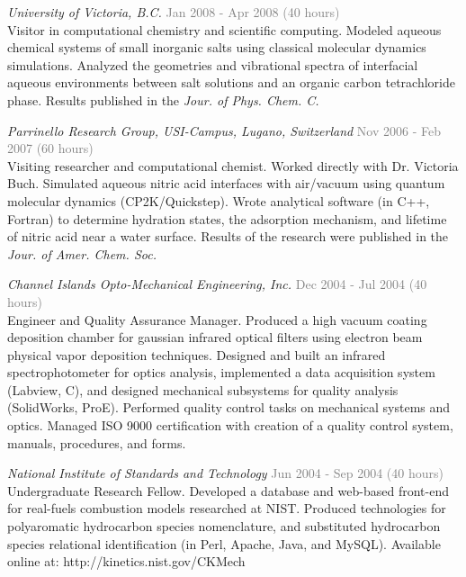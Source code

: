 \documentclass[margin,line]{res}
\begin{document}
\begin{resume}
\emph{University of Victoria, B.C.} \hfill {\textcolor{gray}{Jan 2008 - Apr 2008 (40 hours)}}\\
\nopagebreak
Visitor in computational chemistry and scientific computing.  Modeled aqueous chemical systems of small inorganic salts using classical molecular dynamics simulations. Analyzed the geometries and vibrational spectra of interfacial aqueous environments between salt solutions and an organic carbon tetrachloride phase. Results published in the \textit{Jour. of Phys. Chem. C.}

\emph{Parrinello Research Group, USI-Campus, Lugano, Switzerland}  \hfill { \textcolor{gray}{Nov 2006 - Feb 2007 (60 hours)}} \\
\nopagebreak
Visiting researcher and computational chemist. Worked directly with Dr. Victoria Buch. Simulated aqueous nitric acid interfaces with air/vacuum using quantum molecular dynamics (CP2K/Quickstep). Wrote analytical software (in C++, Fortran) to determine hydration states, the adsorption mechanism, and lifetime of nitric acid near a water surface. Results of the research were published in the \textit{Jour. of Amer. Chem. Soc.}


\pagebreak
\emph{Channel Islands Opto-Mechanical Engineering, Inc.} \hfill {\textcolor{gray}{Dec 2004 - Jul 2004 (40 hours)}} \\
Engineer and Quality Assurance Manager. Produced a high vacuum coating deposition chamber for gaussian infrared optical filters using electron beam physical vapor deposition techniques. Designed and built an infrared spectrophotometer for optics analysis, implemented a data acquisition system (Labview, C), and designed mechanical subsystems for quality analysis (SolidWorks, ProE). Performed quality control tasks on mechanical systems and optics. Managed ISO 9000 certification with creation of a quality control system, manuals, procedures, and forms. 

\emph{National Institute of Standards and Technology} \hfill {\textcolor{gray}{Jun 2004 - Sep 2004 (40 hours)}} \\
Undergraduate Research Fellow. Developed a database and web-based front-end for real-fuels combustion models researched at NIST. Produced technologies for polyaromatic hydrocarbon species nomenclature, and substituted hydrocarbon species relational identification (in Perl, Apache, Java, and MySQL). Available online at: 
http://kinetics.nist.gov/CKMech


\end{resume}
\end{document}

